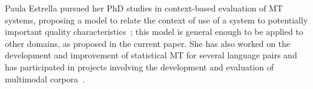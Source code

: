 

Paula Estrella pursued her PhD studies in context-based evaluation of MT
systems, proposing a model to relate the context of use of a system to
potentially important quality characteristics~\cite{estr:impr08,estr:femt09};
this model is general enough to be applied to other domains, as proposed in the
current paper. She has also
worked on the development and improvement of
statistical MT for several language pairs and has participated in projects
involving
the development and evaluation of  multimodal corpora~\cite{multieval}.


